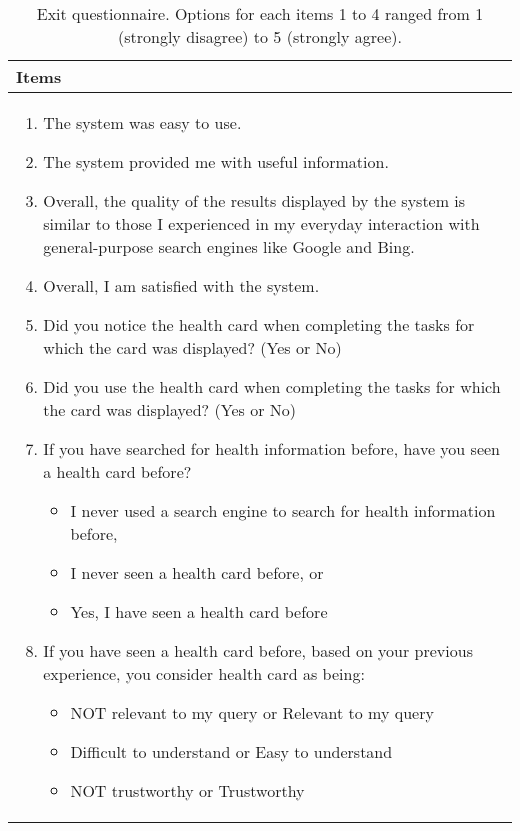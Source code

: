 \documentclass[sigconf]{acmart}
\begin{document}
\begin{table}[tb]
	\centering
	\small
	\caption{Exit questionnaire. Options for each items 1 to 4 ranged from 1 (strongly disagree) to 5 (strongly agree).}\label{table: exit questionnaire}
	\vspace{-10pt}
	\begin{tabular}{p{8cm}}
		\toprule 
		\textbf{Items} \\
		\toprule
		\begin{enumerate}[leftmargin=*,  topsep=0pt, labelsep=1pt]
			\item The system was easy to use. 
			\item The system provided me with useful information.
			\item Overall, the quality of the results displayed by the system is similar to those I experienced in my everyday interaction with general-purpose search engines like Google and Bing.
			\item Overall, I am satisfied with the system.
			
			\item Did you notice the health card when completing the tasks for which the card was displayed? (Yes or No)
			\item Did you use the health card when completing the tasks for which the card was displayed? (Yes or No)
			
			\item If you have searched for health information before, have you seen a health card before? 
			\begin{itemize}
				\item I never used a search engine to search for health information before, 
				\item I never seen a health card before, or
				\item Yes, I have seen a health card before
			\end{itemize}
			
			\item If you have seen a health card before, based on your previous experience, you consider health card as being: 
			\begin{itemize}
				\item NOT relevant to my query or Relevant to my query
				\item Difficult to understand or Easy to understand
				\item NOT trustworthy or Trustworthy
			\end{itemize} 
		\end{enumerate} \\
		\bottomrule
	\end{tabular} 
\end{table}
\end{document}
